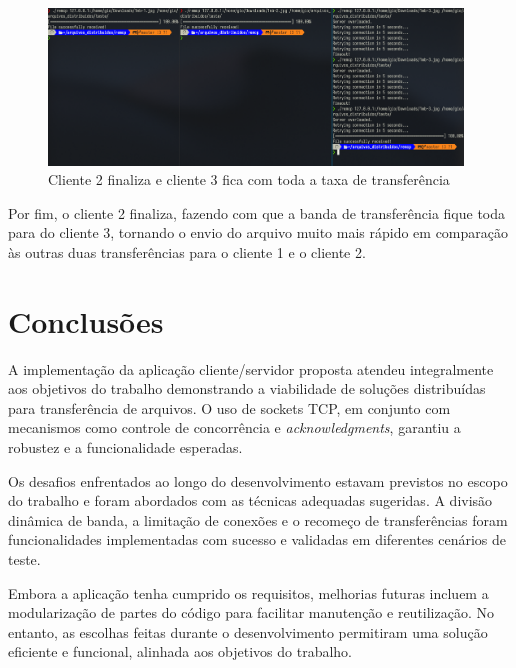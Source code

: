 \documentclass{article}
\begin{document}
\begin{figure}[H]
	\centering
	\includegraphics[width=0.98\textwidth]{run-3.png}
	\caption{Cliente 2 finaliza e cliente 3 fica com toda a taxa de transferência}
\end{figure}

Por fim, o cliente 2 finaliza, fazendo com que a banda de transferência fique toda para do cliente 3, tornando o envio do arquivo muito mais rápido em
comparação às outras duas transferências para o cliente 1 e o cliente 2.

\section*{Conclusões}

A implementação da aplicação cliente/servidor proposta atendeu integralmente aos objetivos do trabalho demonstrando a viabilidade de soluções distribuídas
para transferência de arquivos. O uso de sockets TCP, em conjunto com mecanismos como controle de concorrência e \textit{acknowledgments}, garantiu a
robustez e a funcionalidade esperadas.

Os desafios enfrentados ao longo do desenvolvimento estavam previstos no escopo do trabalho e foram abordados com as técnicas adequadas sugeridas. A divisão dinâmica
de banda, a limitação de conexões e o recomeço de transferências foram funcionalidades implementadas com sucesso e validadas em diferentes cenários de teste.

Embora a aplicação tenha cumprido os requisitos, melhorias futuras incluem a modularização de partes do código para facilitar manutenção e reutilização.
No entanto, as escolhas feitas durante o desenvolvimento permitiram uma solução eficiente e funcional, alinhada aos objetivos do trabalho.
\end{document}
